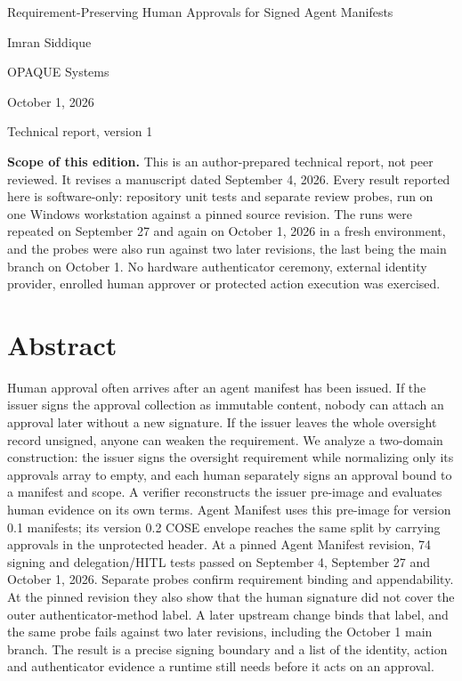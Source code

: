 \documentclass[10pt,letterpaper]{article}
\begin{document}
{\raggedright\headingfont\fontsize{21}{26}\selectfont\color{OceanBlue} Requirement-Preserving Human Approvals for Signed Agent Manifests\par}

\vspace{8pt}Imran Siddique\par OPAQUE Systems\par\vspace{4pt}October 1, 2026\par Technical report, version 1\par

\vspace{5pt}{\color{CoralGreen}\hrule}\vspace{8pt}

\textbf{Scope of this edition.} This is an author-prepared technical report, not peer reviewed. It revises a manuscript dated September 4, 2026. Every result reported here is software-only: repository unit tests and separate review probes, run on one Windows workstation against a pinned source revision. The runs were repeated on September 27 and again on October 1, 2026 in a fresh environment, and the probes were also run against two later revisions, the last being the main branch on October 1. No hardware authenticator ceremony, external identity provider, enrolled human approver or protected action execution was exercised.\par

\section*{Abstract}

Human approval often arrives after an agent manifest has been issued. If the issuer signs the approval collection as immutable content, nobody can attach an approval later without a new signature. If the issuer leaves the whole oversight record unsigned, anyone can weaken the requirement. We analyze a two-domain construction: the issuer signs the oversight requirement while normalizing only its approvals array to empty, and each human separately signs an approval bound to a manifest and scope. A verifier reconstructs the issuer pre-image and evaluates human evidence on its own terms. Agent Manifest uses this pre-image for version 0.1 manifests; its version 0.2 COSE envelope reaches the same split by carrying approvals in the unprotected header. At a pinned Agent Manifest revision, 74 signing and delegation/HITL tests passed on September 4, September 27 and October 1, 2026. Separate probes confirm requirement binding and appendability. At the pinned revision they also show that the human signature did not cover the outer authenticator-method label. A later upstream change binds that label, and the same probe fails against two later revisions, including the October 1 main branch. The result is a precise signing boundary and a list of the identity, action and authenticator evidence a runtime still needs before it acts on an approval.
\end{document}
